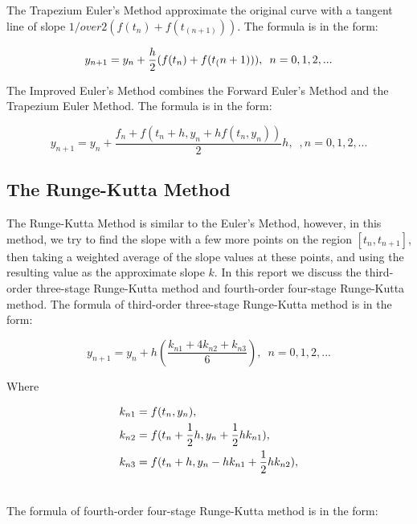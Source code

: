 \documentclass[a4paper]{article}
\begin{document}
	The Trapezium Euler’s Method approximate the original curve with a tangent line of slope ${1/over2}(f(t_n )+f(t_(n+1)))$. The formula is in the form:
	
	\begin{equation}\label{eq.1}
		y_{n+1} = y_n + {h \over 2}(f(t_n )+f(t_(n+1))), \enspace n = 0,1,2,...
	\end{equation}
	
	The Improved Euler’s Method combines the Forward Euler’s Method and the Trapezium Euler Method. The formula is in the form:
	
	\begin{equation}\label{eq.3}
		y_{n+1} = y_n + \frac{f_n + f(t_n + h, y_n + hf(t_n, y_n))}{2}h, \enspace, n = 0,1,2,...
	\end{equation}	
	
	
	\subsection{The Runge-Kutta Method}
	
	The Runge-Kutta Method is similar to the Euler’s Method, however, in this method, we try to find the slope with a few more points on the region $[t_n, t_{n+1}]$, then taking a weighted average of the slope values at these points, and using the resulting value as the approximate slope $k$.
	In this report we discuss the third-order three-stage Runge-Kutta method and fourth-order four-stage Runge-Kutta method. The formula of third-order three-stage Runge-Kutta method is in the form:
	
	\begin{equation}\label{eq.4}
		y_{n+1} = y_n + h(\frac{k_{n1} + 4k_{n2} + k_{n3} }{6}), \enspace n = 0, 1, 2,...
	\end{equation}
	
	Where
	
	\begin{align} \nonumber
		k_{n1} &= f(t_n, y_n), \\ \nonumber
		k_{n2} &= f(t_n + {1 \over 2}h, y_n + {1 \over 2}hk_{n1}), \\ \nonumber
		k_{n3} &= f(t_n + h, y_n - hk_{n1} + {1 \over 2}hk_{n2}), \\ \nonumber
	\end{align}
	
	The formula of fourth-order four-stage Runge-Kutta method is in the form:
	
\end{document}
